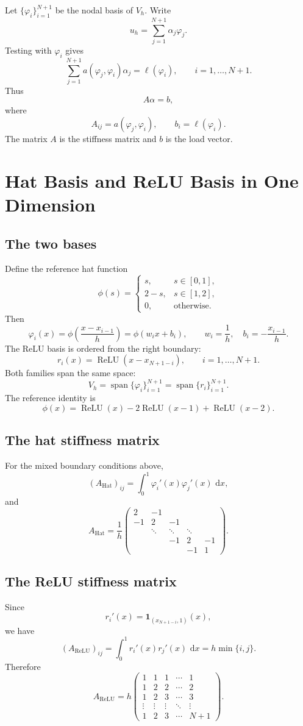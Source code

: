 \documentclass[11pt,a4paper]{article}
\newcommand{\ReLU}{\operatorname{ReLU}}
\newcommand{\Span}{\operatorname{span}}
\newcommand{\dd}{\,\mathrm{d}}
\newcommand{\Vh}{V_h}
\newcommand{\Ah}{A_{\mathrm{Hat}}}
\newcommand{\Ar}{A_{\mathrm{ReLU}}}
\theoremstyle{definition}
\theoremstyle{plain}
\theoremstyle{remark}
\begin{document}
Let $\{\varphi_i\}_{i=1}^{N+1}$ be the nodal basis of $\Vh$. Write
\[
  u_h=\sum_{j=1}^{N+1}\alpha_j\varphi_j.
\]
Testing with $\varphi_i$ gives
\[
  \sum_{j=1}^{N+1}a(\varphi_j,\varphi_i)\alpha_j
  =\ell(\varphi_i),
  \qquad i=1,\ldots,N+1.
\]
Thus
\[
  A\alpha=b,
\]
where
\[
  A_{ij}=a(\varphi_j,\varphi_i),
  \qquad
  b_i=\ell(\varphi_i).
\]
The matrix $A$ is the stiffness matrix and $b$ is the load vector.

\section{Hat Basis and ReLU Basis in One Dimension}

\subsection{The two bases}
Define the reference hat function
\[
  \phi(s)=
  \begin{cases}
    s,&s\in[0,1],\\
    2-s,&s\in[1,2],\\
    0,&\text{otherwise}.
  \end{cases}
\]
Then
\[
  \varphi_i(x)=\phi\left(\frac{x-x_{i-1}}h\right)
  =\phi(w_ix+b_i),
  \qquad
  w_i=\frac1h,
  \quad b_i=-\frac{x_{i-1}}h.
\]
The ReLU basis is ordered from the right boundary:
\[
  r_i(x)=\ReLU(x-x_{N+1-i}),
  \qquad i=1,\ldots,N+1.
\]
Both families span the same space:
\[
  \Vh=\Span\{\varphi_i\}_{i=1}^{N+1}
  =\Span\{r_i\}_{i=1}^{N+1}.
\]
The reference identity is
\[
  \phi(x)=\ReLU(x)-2\ReLU(x-1)+\ReLU(x-2).
\]

\subsection{The hat stiffness matrix}
For the mixed boundary conditions above,
\[
  (\Ah)_{ij}=\int_0^1\varphi_i'(x)\varphi_j'(x)\,\dd x,
\]
and
\[
  \Ah=\frac1h
  \begin{pmatrix}
    2&-1&&&\\
    -1&2&-1&&\\
    &\ddots&\ddots&\ddots&\\
    &&-1&2&-1\\
    &&&-1&1
  \end{pmatrix}.
\]

\subsection{The ReLU stiffness matrix}
Since
\[
  r_i'(x)=\mathbf{1}_{(x_{N+1-i},1)}(x),
\]
we have
\[
  (\Ar)_{ij}
  =\int_0^1r_i'(x)r_j'(x)\,\dd x
  =h\min\{i,j\}.
\]
Therefore
\[
  \Ar=h
  \begin{pmatrix}
    1&1&1&\cdots&1\\
    1&2&2&\cdots&2\\
    1&2&3&\cdots&3\\
    \vdots&\vdots&\vdots&\ddots&\vdots\\
    1&2&3&\cdots&N+1
  \end{pmatrix}.
\]
\end{document}
